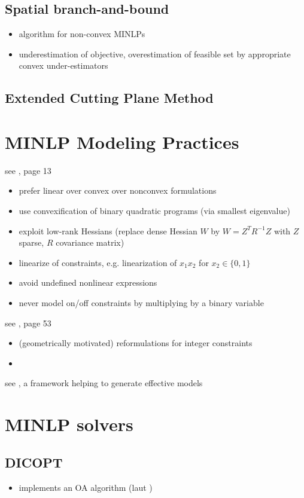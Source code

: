 \documentclass{article}
\begin{document}
\subsection{Spatial branch-and-bound}
\begin{itemize}
\item algorithm for non-convex MINLPs
\item underestimation of objective, overestimation of feasible set by appropriate convex under-estimators
\end{itemize}
\subsection{Extended Cutting Plane Method}

\section{MINLP Modeling Practices}
see \cite{Belotti13}, page 13

\begin{itemize}
\item prefer linear over convex over nonconvex formulations
\item use convexification of binary quadratic programs (via smallest eigenvalue)
\item exploit low-rank Hessians (replace dense Hessian $W$ by $W = Z^T R^{-1} Z$ with $Z$ sparse, $R$ covariance matrix)
\item linearize of constraints, e.g. linearization of $x_1x_2$ for $x_2\in\{0,1\}$
\item avoid undefined nonlinear expressions
\item never model on/off constraints by multiplying by a binary variable
\end{itemize}

\noindent
see \cite{sager2005numerical}, page 53
\begin{itemize}
\item (geometrically motivated) reformulations for integer constraints
\item 
\end{itemize}

\noindent
see \cite{raman1994modelling}, 
a framework helping to generate effective models
\section{MINLP solvers}
\subsection{DICOPT}
\begin{itemize}
\item implements an OA algorithm (laut \cite{bonami2008algorithmic})
\end{itemize}
\end{document}
